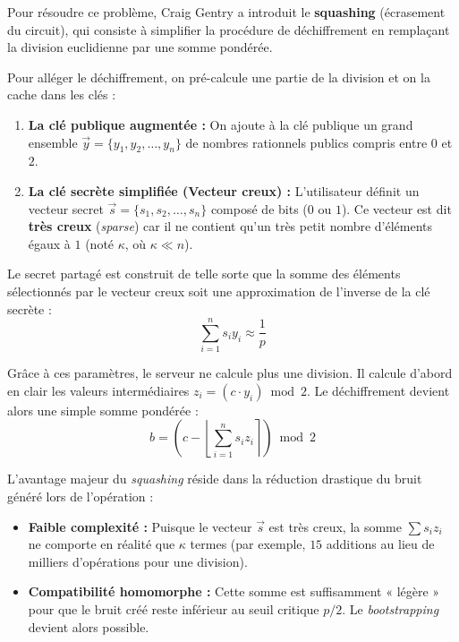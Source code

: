 Pour résoudre ce problème, Craig Gentry a introduit le \textbf{squashing} (écrasement du circuit), qui consiste à simplifier la procédure de déchiffrement en remplaçant la division euclidienne par une somme pondérée.

\begin{definition}
Pour alléger le déchiffrement, on pré-calcule une partie de la division et on la cache dans les clés :
\begin{enumerate}
    \item \textbf{La clé publique augmentée :} On ajoute à la clé publique un grand ensemble $\vec{y} = \{y_1, y_2, \dots, y_n\}$ de nombres rationnels publics compris entre $0$ et $2$.
    \item \textbf{La clé secrète simplifiée (Vecteur creux) :} L'utilisateur définit un vecteur secret $\vec{s} = \{s_1, s_2, \dots, s_n\}$ composé de bits ($0$ ou $1$). Ce vecteur est dit \textbf{très creux} (\textit{sparse}) car il ne contient qu'un très petit nombre d'éléments égaux à $1$ (noté $\kappa$, où $\kappa \ll n$).
\end{enumerate}
Le secret partagé est construit de telle sorte que la somme des éléments sélectionnés par le vecteur creux soit une approximation de l'inverse de la clé secrète :
\[ \sum_{i=1}^{n} s_i y_i \approx \frac{1}{p} \]
\end{definition}

\begin{proposition}
Grâce à ces paramètres, le serveur ne calcule plus une division. Il calcule d'abord en clair les valeurs intermédiaires $z_i = (c \cdot y_i) \bmod 2$. Le déchiffrement devient alors une simple somme pondérée :
\[ b = \left( c - \left\lfloor \sum_{i=1}^{n} s_i z_i \right\rceil \right) \bmod 2 \]
\end{proposition}

\begin{remark}
L'avantage majeur du \textit{squashing} réside dans la réduction drastique du bruit généré lors de l'opération :
\begin{itemize}
    \item \textbf{Faible complexité :} Puisque le vecteur $\vec{s}$ est très creux, la somme $\sum s_i z_i$ ne comporte en réalité que $\kappa$ termes (par exemple, $15$ additions au lieu de milliers d'opérations pour une division). 
    \item \textbf{Compatibilité homomorphe :} Cette somme est suffisamment « légère » pour que le bruit créé reste inférieur au seuil critique $p/2$. Le \textit{bootstrapping} devient alors possible.
\end{itemize}
\end{remark}